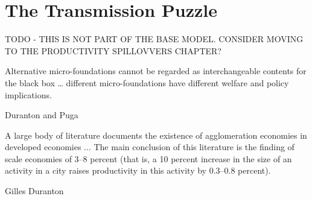 \chapter{The Transmission Puzzle} \label{chapter-tramsmission}%

TODO - THIS IS NOT PART OF THE BASE MODEL. CONSIDER MOVING TO THE PRODUCTIVITY SPILLOVVERS CHAPTER?


\epigraph{Alternative micro-foundations cannot be regarded as interchangeable contents for the black box \dots %
different micro-foundations have different welfare and policy implications. %
}{Duranton and Puga \cite{durantonMicroFoundationsUrbanAgglomeration2004}}

\epigraph{A large body of literature documents the existence of agglomeration economies in developed economies ... The main conclusion of this literature is the finding of scale economies of 3--8 percent (that is, a 10 percent increase in the size of an activity in a city raises productivity in this activity by 0.3--0.8 percent).}{Gilles Duranton \cite{durantonAreCitiesEngines2009}} %

